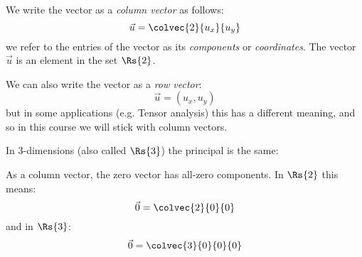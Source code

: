 We write the vector as a \emph{column vector} as follows:
\begin{equation*}
  \vec{u}=\colvec{2}{u_{x}}{u_{y}}
\end{equation*}
we refer to the entries of the vector as its \emph{components} or \emph{coordinates}. The vector $\vec{u}$ is an element in the set $\Rs{2}$.
\begin{warning}
  We can also write the vector as a \emph{row vector}:
  \begin{equation*}
  \vec{u} = \left( u_{x}, u_{y} \right)
  \end{equation*}
  but in some applications (e.g. Tensor analysis) this has a different meaning, and so in this course we will stick with column vectors.
\end{warning}

In 3-dimensions (also called $\Rs{3}$) the principal is the same:
\begin{figure}[H]
  \centering
\end{figure}

As a column vector, the zero vector has all-zero components. In $\Rs{2}$ this means:
\begin{equation*}
  \vec{0} = \colvec{2}{0}{0}
\end{equation*}
and in $\Rs{3}$:
\begin{equation*}
  \vec{0} = \colvec{3}{0}{0}{0}
\end{equation*}

